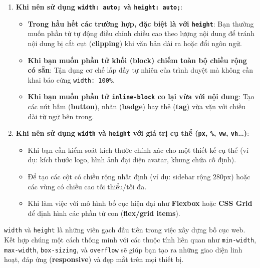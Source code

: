 \documentclass[11pt,oneside]{book}
\newcommand{\codeinline}[1]{\textcolor{accentOrange}{\texttt{#1}}}
\newcommand{\term}[1]{\textbf{\textcolor{primaryBlue}{#1}}}
\begin{document}
\begin{enumerate}[leftmargin=1.5em, itemsep=6pt, parsep=0pt]
    \item \textbf{Khi nên sử dụng \codeinline{width: auto;} và \codeinline{height: auto;}}:
    \begin{itemize}[leftmargin=1.2em, itemsep=3pt, parsep=0pt]
        \item \textbf{Trong hầu hết các trường hợp, đặc biệt là với \codeinline{height}}: Bạn thường muốn phần tử tự động điều chỉnh chiều cao theo lượng nội dung để tránh nội dung bị cắt cụt (\term{clipping}) khi văn bản dài ra hoặc đổi ngôn ngữ.
        \item \textbf{Khi bạn muốn phần tử khối (block) chiếm toàn bộ chiều rộng có sẵn}: Tận dụng cơ chế lấp đầy tự nhiên của trình duyệt mà không cần khai báo cứng \codeinline{width: 100\%}.
        \item \textbf{Khi bạn muốn phần tử \codeinline{inline-block} co lại vừa với nội dung}: Tạo các nút bấm (\term{button}), nhãn (\term{badge}) hay thẻ (\term{tag}) vừa vặn với chiều dài từ ngữ bên trong.
    \end{itemize}

    \item \textbf{Khi nên sử dụng \codeinline{width} và \codeinline{height} với giá trị cụ thể (\codeinline{px}, \codeinline{\%}, \codeinline{vw}, \codeinline{vh}\dots)}:
    \begin{itemize}[leftmargin=1.2em, itemsep=3pt, parsep=0pt]
        \item Khi bạn cần kiểm soát kích thước chính xác cho một thiết kế cụ thể (ví dụ: kích thước logo, hình ảnh đại diện avatar, khung chứa cố định).
        \item Để tạo các cột có chiều rộng nhất định (ví dụ: sidebar rộng $280\text{px}$) hoặc các vùng có chiều cao tối thiểu/tối đa.
        \item Khi làm việc với mô hình bố cục hiện đại như \term{Flexbox} hoặc \term{CSS Grid} để định hình các phần tử con (\term{flex/grid items}).
    \end{itemize}
\end{enumerate}

\begin{conceptBox}
\codeinline{width} và \codeinline{height} là những viên gạch đầu tiên trong việc xây dựng bố cục web. Kết hợp chúng một cách thông minh với các thuộc tính liên quan như \codeinline{min-width}, \codeinline{max-width}, \codeinline{box-sizing}, và \codeinline{overflow} sẽ giúp bạn tạo ra những giao diện linh hoạt, đáp ứng (\term{responsive}) và đẹp mắt trên mọi thiết bị.
\end{conceptBox}
\end{document}
